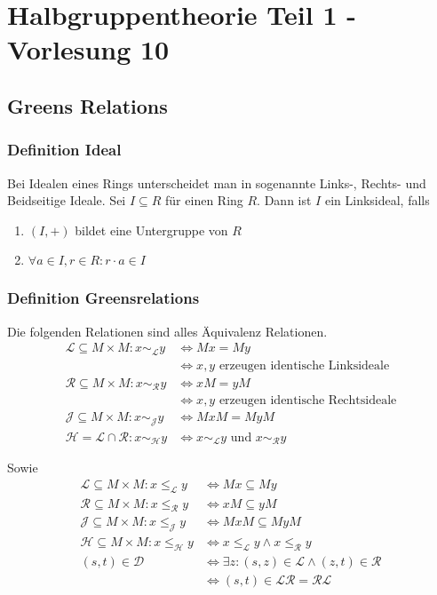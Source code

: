 \documentclass[12pt, german]{article}
\newcommand{\grel}{\sim_{\mathcal{L}}}
\newcommand{\grer}{\sim_{\mathcal{R}}}
\newcommand{\grej}{\sim_{\mathcal{J}}}
\newcommand{\greh}{\sim_{\mathcal{H}}}
\newcommand{\lgreleq}{\leqslant_{\mathcal{L}}}
\newcommand{\lgrereq}{\leqslant_{\mathcal{R}}}
\newcommand{\lgrejeq}{\leqslant_{\mathcal{J}}}
\newcommand{\lgreheq}{\leqslant_{\mathcal{H}}}
\begin{document}
	\section{Halbgruppentheorie Teil 1 - Vorlesung 10}
	\subsection{Greens Relations}
	\subsubsection{Definition Ideal}
	Bei Idealen eines Rings unterscheidet man in sogenannte Links-, Rechts- und Beidseitige Ideale. 
	Sei $I \subseteq R$ für einen Ring $R$. Dann ist $I$ ein Linksideal, falls 
	\begin{enumerate}[label= \arabic*.)]
		\item $(I, +)$ bildet eine Untergruppe von $R$ 
		\item $\forall a \in I, r \in R : r \cdot a \in I  $
	\end{enumerate}
	\subsubsection{Definition Greensrelations}	
	Die folgenden Relationen sind alles Äquivalenz Relationen. 
	\begin{align*}
		\mathcal L \subseteq M \times M: x \grel y &\iff Mx = My \\ 
		&\iff x,y \text{ erzeugen identische Linksideale} \\
		\mathcal R \subseteq M \times M: x \grer y &\iff xM = yM  \\ 
		&\iff x,y \text{ erzeugen identische Rechtsideale} \\
		\mathcal J \subseteq M \times M: x \grej y &\iff MxM = MyM \\ 
		\mathcal H = \mathcal L \cap \mathcal R: x \greh y &\iff x \grel y \text{ und } x \grer y
	\end{align*}
	
	Sowie 
	\begin{align*}
		\mathcal L \subseteq M \times M: x \lgreleq y &\iff Mx \subseteq My \\
		\mathcal R \subseteq M \times M: x \lgrereq y &\iff xM \subseteq yM \\
		\mathcal J \subseteq M \times M: x \lgrejeq y &\iff MxM \subseteq MyM  \\
		\mathcal H \subseteq M \times M: x \lgreheq y &\iff x \lgreleq y \land x \lgrereq y \\
		(s,t) \in \mathcal{D} &\iff \exists z: (s,z) \in \mathcal L \land (z,t) \in \mathcal R \\ 
		&\iff (s,t) \in \mathcal L \mathcal{R} =  \mathcal R \mathcal{L}
	\end{align*}
	
\end{document}
